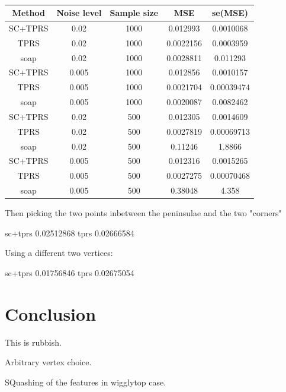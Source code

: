 \documentclass[a4paper,10pt]{amsart}
\begin{document}
\begin{table}[ht]
\begin{tabular}{c c c c c}\\
Method & Noise level & Sample size & MSE & se(MSE)\\
\hline
\hline
SC+TPRS & 0.02 & 1000 & 0.012993 & 0.0010068\\
TPRS & 0.02 & 1000 & 0.0022156 & 0.0003959\\
soap & 0.02 & 1000 & 0.0028811 & 0.011293\\
SC+TPRS & 0.005 & 1000 & 0.012856 & 0.0010157\\
TPRS & 0.005 & 1000 & 0.0021704 & 0.00039474\\
soap & 0.005 & 1000 & 0.0020087 & 0.0082462\\
SC+TPRS & 0.02 & 500 & 0.012305 & 0.0014609\\
TPRS & 0.02 & 500 & 0.0027819 & 0.00069713\\
soap & 0.02 & 500 & 0.11246 & 1.8866\\
SC+TPRS & 0.005 & 500 & 0.012316 & 0.0015265\\
TPRS & 0.005 & 500 & 0.0027275 & 0.00070468\\
soap & 0.005 & 500 & 0.38048 & 4.358\\
\end{tabular}
\caption{}
\label{}
\end{table}

Then picking the two points inbetween the peninsulae and the two "corners"

sc+tprs 0.02512868 
tprs 0.02666584 


Using a different two vertices:

sc+tprs 0.01756846 
tprs 0.02675054 




\section{Conclusion}

This is rubbish.

Arbitrary vertex choice.

SQuashing of the features in wigglytop case.














\end{document}
